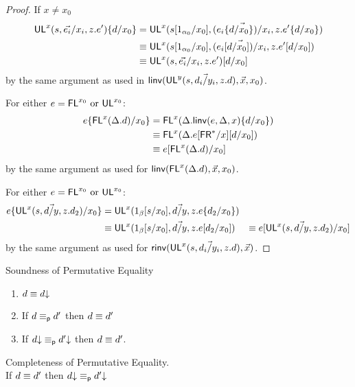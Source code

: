 \begin{proof}
If $x \neq x_0$
\begin{align*}
\mathsf{UL}^{x}_{}(s,\vec{e_i}/x_i,z.e')\{d/x_0\} 
&= {\mathsf{UL}^{x}_{}(s[1_{\alpha_0}/x_0],\vec{(e_i\{d/x_0\})/x_i},z.e'\{d/x_0\})} \\
&\equiv {\ensuremath{\mathsf{UL}^{x}_{}(s[1_{\alpha_0}/x_0],\vec{(e_i[d/x_0])/x_i},z.e'[d/x_0])}} \\
&\equiv \mathsf{UL}^{x}_{}(s,\vec{e_i}/x_i,z.e')[d/x_0] 
\end{align*}
by the same argument as used in $\mathsf{linv}(\mathsf{UL}^{y}_{}(s,\vec{d_i/y_i},z.d),\vec{x},x_0)$.

For either $e = \mathsf{FL}^{x_0} \text{ or } \mathsf{UL}^{x_0}$:
\begin{align*}
e\{\mathsf{FL}^{x}(\Delta.d)/x_0\} 
&= \mathsf{FL}^{x}(\Delta.\mathsf{linv}(e,\Delta,x)\{d/x_0\}) \\
&\equiv \mathsf{FL}^{x}(\Delta.e[\mathsf{FR}^*/x][d/x_0]) \\
&\equiv e[\mathsf{FL}^{x}(\Delta.d)/x_0] 
\end{align*}
by the same argument as used for $\mathsf{linv}(\mathsf{FL}^{x}(\Delta.d),\vec{x},x_0)$.

For either $e = \mathsf{FL}^{x_0} \text{ or } \mathsf{UL}^{x_0}$:
\begin{align*}
e\{\mathsf{UL}^{x}_{}(s,\vec{d/y},z.d_2)/x_0\} 
&= \mathsf{UL}^{x}_{}(1_\beta[s/x_0],\vec{d/y},z.e\{d_2/x_0\}) \\
&\equiv \mathsf{UL}^{x}_{}(1_\beta[s/x_0],\vec{d/y},z.e[d_2/x_0]) 
&\equiv e[\mathsf{UL}^{x}_{}(s,\vec{d/y},z.d_2)/x_0] 
\end{align*}
by the same argument as used for $\mathsf{rinv}(\mathsf{UL}^{x}_{}(s,\vec{d_i/y_i},z.d),\vec{x})$.

\end{proof}

\begin{conjecture}{Soundness of Permutative Equality} \label{thm:permutative-soundess}
\begin{enumerate}
\item $d \equiv d\mathord{\downarrow}$
\item If $d \equiv_{\mathsf{p}} d'$ then $d \equiv d'$
\item If $d\mathord{\downarrow} \equiv_{\mathsf{p}} d'\mathord{\downarrow}$ then $d \equiv d'$.  
\end{enumerate}
\end{conjecture}

\begin{conjecture}{Completeness of Permutative Equality.}\\ \label{thm:permutative-completeness}
If $d \equiv d'$ then $d\mathord{\downarrow} \equiv_{\mathsf{p}} d'\mathord{\downarrow}$
\end{conjecture}

